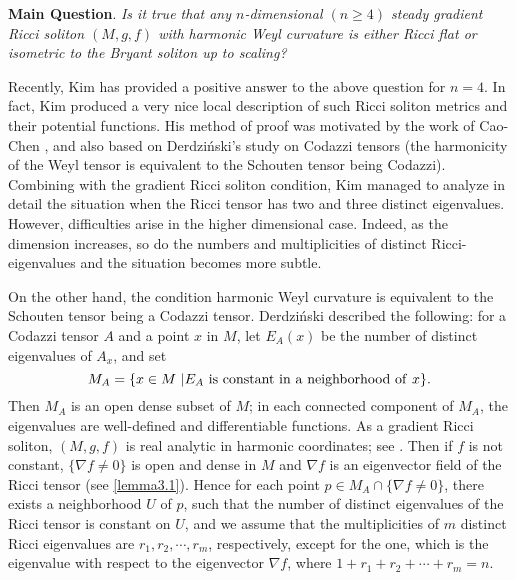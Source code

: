 \documentclass{amsart}
\theoremstyle{definition}
\theoremstyle{remark}
\numberwithin{equation}{section}
\begin{document}
\medskip
\noindent \textbf{Main Question}.
\emph{Is it true that any $n$-dimensional $(n\geq 4)$ steady gradient Ricci soliton $(M, g, f)$ with harmonic Weyl curvature is either Ricci flat or isometric to the Bryant soliton up to scaling?}

\medskip
Recently, Kim \cite{Kim} has provided a positive answer to the above question for $n=4$. 
In fact, Kim produced a very nice local description of such Ricci soliton metrics and their potential functions. His method of proof was motivated by the work of Cao-Chen \cite{CC1, CC2}, and also based on Derdzi\'{n}ski's study on Codazzi tensors \cite{De} (the harmonicity of the Weyl tensor is equivalent to the Schouten tensor being Codazzi).  
Combining with the gradient Ricci soliton condition, Kim managed to analyze in detail the situation when the Ricci tensor has two and three distinct eigenvalues. However, difficulties arise in the higher dimensional case. Indeed, as the dimension increases, so do the numbers and multiplicities of distinct Ricci-eigenvalues and the situation becomes more subtle.

\medskip
On the other hand, the condition harmonic Weyl curvature is equivalent to the Schouten tensor being a Codazzi tensor. 
Derdzi\'{n}ski \cite{De} described the following: for a Codazzi tensor $A$ and a point $x$ in $M$, 
let $E_A(x)$ be the number of distinct eigenvalues of $A_x$,
and set 
\[
M_A = \{  x \in M \ | E_A {\rm \ is \ constant \ in \ a \ neighborhood \ of \ } x \}.
\] 
Then $M_A$ is an open dense subset of $M$;
in each connected component of $M_A$, 
the eigenvalues are well-defined and differentiable functions.
As a gradient Ricci soliton, 
$(M,g,f)$ is real analytic in harmonic coordinates; see \cite{Iv, HPW}. 
Then if $f$ is not constant, $\{\nabla f \neq 0\}$ is open and dense in $M$ and $\nabla f $ is an eigenvector field of the Ricci tensor (see \ref{lemma3.1}). 
Hence for each point $p\in M_A \cap \{ \nabla f \neq 0  \}$, there exists a neighborhood $U$ of $p$, 
such that the number of distinct eigenvalues of the Ricci tensor is constant on $U$,
and we assume that the multiplicities of $m$ distinct Ricci eigenvalues are $r_{1}, r_{2}, \cdots, r_{m}$, respectively, 
except for the one, which is the eigenvalue with respect to the eigenvector $\nabla f$,
where $1+r_{1}+r_{2}+ \cdots+ r_{m}=n $.
\end{document}
